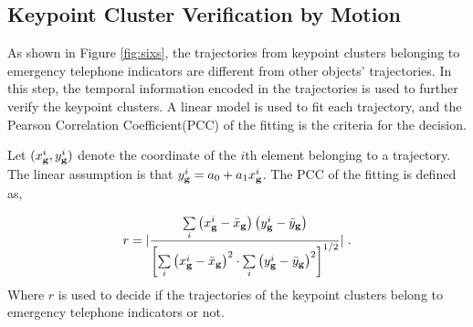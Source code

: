 \subsection{Keypoint Cluster Verification by Motion}

As shown in Figure \ref{fig:sixs}, the trajectories from keypoint clusters belonging to emergency telephone indicators are different from other objects' trajectories. In this step, the temporal information encoded in the trajectories is used to further verify the keypoint clusters. A linear model is used to fit each trajectory, and the Pearson Correlation Coefficient(PCC) of the fitting is the criteria for the decision. 

Let $(x^i_{\bf{g}},y^i_{\bf{g}})$ denote the coordinate of the $i$th element belonging to a trajectory. The linear assumption is that $y^i_{\bf{g}}=a_0+a_1{x^i_{\bf{g}}}$. The PCC of the fitting is defined as,

\begin{equation}
r =| \frac{{\sum\limits_i {\left( {{x^i_{\bf{g}}} -  {\bar x_{\bf{g}}}} \right)\left( {{y^i_{\bf{g}}} -  {\bar y_{\bf{g}}}} \right)} }}{{{{\left[ {\sum\limits_i {{{\left( {{x^i_{\bf{g}}} -  {\bar x_{\bf{g}}}} \right)}^2} \cdot \sum\limits_i {{{\left( {{y^i_{\bf{g}}} -  {\bar y_{\bf{g}}}} \right)}^2}} } } \right]}^{1/2}}}}|\;.
\label{eq4}
\end{equation}
Where $r$ is used to decide if the trajectories of the keypoint clusters belong to emergency telephone indicators or not.

